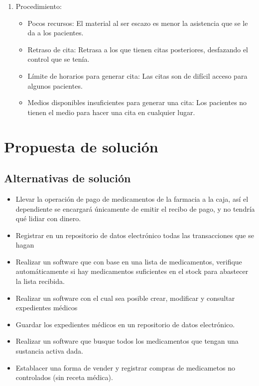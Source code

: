 \begin{enumerate}
\begin{itemize}
\end{itemize}
\item Procedimiento:
\begin{itemize}
\item Pocos recursos: El material al ser escazo es menor la asistencia que se le da a los pacientes.
\item Retraso de cita: Retrasa a los que tienen citas posteriores, desfazando el control que se tenía.
\item Límite de horarios para generar cita: Las citas son de difícil acceso para algunos pacientes.
\item Medios disponibles insuficientes para generar una cita: Los pacientes no tienen el medio para hacer una cita en cualquier lugar.
\end{itemize}
\end{enumerate}


\section{Propuesta de solución}

\subsection{Alternativas de solución}

\begin{itemize}
\item Llevar la operaci\'on de pago de medicamentos de la farmacia a la caja, as\'i el dependiente se encargar\'a \'unicamente de emitir el recibo de pago, y no tendr\'ia qu\'e lidiar con dinero.
\item Registrar en un repositorio de datos electr\'onico todas las transacciones que se hagan
\item Realizar un software que con base en una lista de medicamentos, verifique autom\'aticamente si hay medicamentos suficientes en el stock para abastecer la lista recibida.
\item Realizar un software con el cual sea posible crear, modificar y consultar expedientes m\'edicos
\item Guardar los expedientes m\'edicos en un repositorio de datos electr\'onico.
\item Realizar un software que busque todos los medicamentos que tengan una sustancia activa dada.
\item Establacer una forma de vender y registrar compras de medicametos no controlados (sin receta m\'edica).
\end{itemize}
